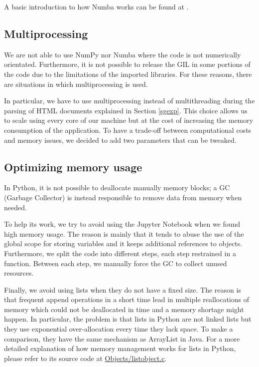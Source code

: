A basic introduction to how Numba works can be found at \cite{10.1145/2833157.2833162}.

\subsection{Multiprocessing}
We are not able to use NumPy nor Numba where the code is not numerically orientated.
Furthermore, it is not possible to release the GIL in some portions of the code
due to the limitations of the imported libraries.
For these reasons, there are situations in which multiprocessing is used.

In particular, we have to use multiprocessing instead of multithreading during the parsing of
HTML documents explained in Section \ref{sgexp}.
This choice allows us to scale using every core of our machine
but at the cost of increasing the memory consumption of the application.
To have a trade-off between computational costs
and memory issues, we decided to add two parameters that can be tweaked.

\subsection{Optimizing memory usage}
In Python, it is not possible to deallocate manually memory blocks; a GC (Garbage Collector)
is instead responsible to remove data from memory when needed.

To help its work, we try to avoid using the Jupyter Notebook when we found high memory usage.
The reason is mainly that it tends to abuse the use of the global scope for storing variables
and it keeps additional references to objects. Furthermore, we split the code into different steps,
each step restrained in a function.
Between each step, we manually force the GC to collect unused resources.

Finally, we avoid using lists when they do not have a fixed size.
The reason is that frequent append operations in a short time lead in multiple reallocations of
memory which could not be deallocated in time and a memory shortage might happen.
In particular, the problem is that lists in Python are not linked lists but they use
exponential over-allocation every time they lack space. To make a comparison, they have the same
mechanism as ArrayList in Java.
For a more detailed explanation of how memory management works for lists in Python, please refer to
its source code at
\href{https://github.com/python/cpython/blob/3.7/Objects/listobject.c}{Objects/listobject.c}.